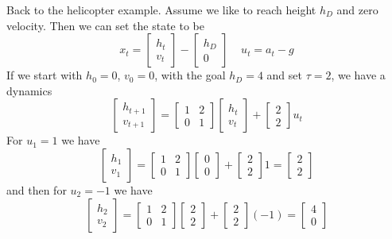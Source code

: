 Back to the helicopter example. Assume we like to reach height $h_D$
and zero velocity. Then we can set the state to be
\[
x_t=\begin{bmatrix}
h_{t}\\
v_{t}
\end{bmatrix}- \begin{bmatrix}
h_{D}\\
0
\end{bmatrix}
\;\;\;\; u_t=a_t-g
\]
If we start with $h_0=0$, $v_0=0$, with the goal $h_D=4$ and set
$\tau=2$, we have a dynamics
\[
\begin{bmatrix}
h_{t+1}\\
v_{t+1}
\end{bmatrix}
=
\begin{bmatrix}
1& 2\\
0 & 1
\end{bmatrix}
\begin{bmatrix}
h_{t}\\
v_{t}
\end{bmatrix}
+
\begin{bmatrix}
2\\
2
\end{bmatrix}
u_t
\]
For $u_1=1$ we have
\[
\begin{bmatrix}
h_{1}\\
v_{1}
\end{bmatrix}
=
\begin{bmatrix}
1& 2\\
0 & 1
\end{bmatrix}
\begin{bmatrix}
0\\
0
\end{bmatrix}
+
\begin{bmatrix}
2\\
2
\end{bmatrix}
1
=
\begin{bmatrix}
2\\
2
\end{bmatrix}
\]
and then for $u_2=-1$ we have
\[
\begin{bmatrix}
h_{2}\\
v_{2}
\end{bmatrix}
=
\begin{bmatrix}
1& 2\\
0 & 1
\end{bmatrix}
\begin{bmatrix}
2\\
2
\end{bmatrix}
+
\begin{bmatrix}
2\\
2
\end{bmatrix}
(-1) =
\begin{bmatrix}
4\\
0
\end{bmatrix}
\]

